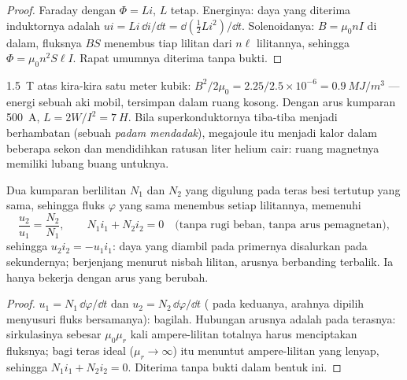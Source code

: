 \begin{proof}
Faraday dengan $\Phi = Li$, $L$ tetap. Energinya: daya yang diterima
induktornya adalah $ui = Li\,\dd i/\dd t = \dd(\tfrac12Li^2)/\dd t$. Solenoidanya:
$B = \mu_0nI$ di dalam, fluksnya $BS$ menembus tiap lilitan dari $n\ell$ lilitannya, sehingga $\Phi =
\mu_0n^2S\ell I$. Rapat umumnya diterima tanpa bukti.
\end{proof}

\begin{example}\label{ex:b1:induction:mri}
\qty{1.5}{T} atas kira-kira satu meter kubik: $B^2/2\mu_0 = 2.25/2.5 \times 10^{-6} =
\qty{0.9}{MJ/m^3}$ --- energi sebuah aki mobil, tersimpan dalam ruang kosong.
Dengan arus kumparan \qty{500}{A}, $L = 2W/I^2 = \qty{7}{H}$. Bila
superkonduktornya tiba-tiba menjadi berhambatan (sebuah \emph{padam mendadak}), megajoule itu
menjadi kalor dalam beberapa sekon dan mendidihkan ratusan liter helium
cair: ruang magnetnya memiliki lubang buang untuknya.
\end{example}

\begin{proposition}\label{prop:b1:induction:transformer}
Dua kumparan berlilitan $N_1$ dan $N_2$ yang digulung pada teras besi tertutup yang sama,
sehingga fluks $\varphi$ yang sama menembus setiap lilitannya, memenuhi
\[
\frac{u_2}{u_1} = \frac{N_2}{N_1} , \qquad N_1i_1 + N_2i_2 = 0 \quad\text{(tanpa rugi beban, tanpa arus pemagnetan)},
\]
sehingga $u_2i_2 = -u_1i_1$: daya yang diambil pada primernya disalurkan
pada sekundernya;  berjenjang menurut nisbah lilitan, arusnya
berbanding terbalik. Ia hanya bekerja dengan arus yang berubah.
\end{proposition}

\begin{proof}
$u_1 = N_1\,\dd\varphi/\dd t$ dan $u_2 = N_2\,\dd\varphi/\dd t$ ( pada keduanya, arahnya dipilih menyusuri fluks bersamanya): bagilah.
Hubungan arusnya adalah  pada terasnya: sirkulasinya
sebesar $\mu_0\mu_r$ kali ampere-lilitan totalnya harus menciptakan
fluksnya; bagi teras ideal ($\mu_r \to \infty$) itu menuntut ampere-lilitan
yang lenyap, sehingga $N_1i_1 + N_2i_2 = 0$. Diterima tanpa bukti dalam bentuk ini.
\end{proof}

